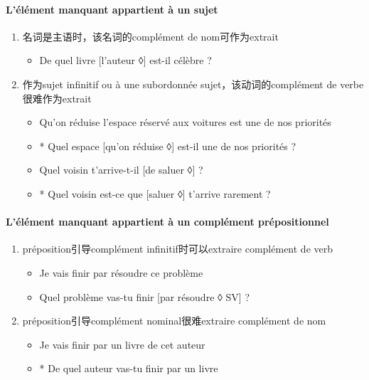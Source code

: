 \documentclass[UTF8]{report}
\begin{document}
\paragraph{L’élément manquant appartient à un sujet}
\begin{enumerate}
    \item 名词是主语时，该名词的complément de nom可作为extrait
    \begin{itemize}
        \item  De quel livre [l’auteur ◊] est-il célèbre ?
    \end{itemize}
    \item 作为sujet infinitif ou à une subordonnée sujet，该动词的complément de verbe很难作为extrait
    \begin{itemize}
        \item Qu’on réduise l’espace réservé aux voitures est une de nos priorités
        \item * Quel espace [qu’on réduise ◊] est-il une de nos priorités ?
        \item Quel voisin t’arrive-t-il [de saluer ◊] ?
        \item * Quel voisin est-ce que [saluer ◊] t’arrive rarement ?
    \end{itemize}
\end{enumerate}
\paragraph{L’élément manquant appartient à un complément prépositionnel}
\begin{enumerate}
    \item préposition引导complément infinitif时可以extraire complément de verb
    \begin{itemize}
        \item Je vais finir par résoudre ce problème 
        \item Quel problème vas-tu finir [par résoudre ◊ SV] ?
    \end{itemize}
    \item préposition引导complément nominal很难extraire complément de nom
    \begin{itemize}
        \item Je vais finir par un livre de cet auteur
        \item * De quel auteur vas-tu finir par un livre
    \end{itemize}
\end{enumerate}
\end{document}
